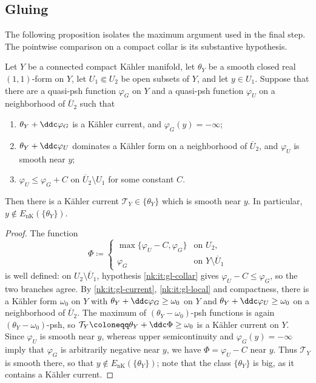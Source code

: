 \subsection{Gluing}

The following proposition isolates the maximum argument used in the final step. The pointwise comparison on a compact collar is its substantive hypothesis.

\begin{proposition}\label{nk:prop:gluing}
Let $Y$ be a connected compact K\"ahler manifold, let $\theta_Y$ be
a smooth closed real $(1,1)$-form on $Y$, let $U_1\Subset U_2$ be
open subsets of $Y$, and let $y\in U_1$. Suppose that there are a
quasi-psh function $\varphi_G$ on $Y$ and a quasi-psh function
$\varphi_U$ on a neighborhood of $\overline U_2$ such that
\begin{enumerate}[label=\textup{(\roman*)},leftmargin=*,itemsep=.25em]
\item\label{nk:it:gl-current}
  $\theta_Y+\ddc\varphi_G$ is a K\"ahler current, and
  $\varphi_G(y)=-\infty$;
\item\label{nk:it:gl-local}
  $\theta_Y+\ddc\varphi_U$ dominates a K\"ahler form on a neighborhood
  of $\overline U_2$, and $\varphi_U$ is smooth near $y$;
\item\label{nk:it:gl-collar}
  $\varphi_U\le\varphi_G+C$ on $\overline U_2\setminus U_1$ for some
  constant $C$.
\end{enumerate}
Then there is a K\"ahler current $\mathcal T_Y\in\{\theta_Y\}$ which is
smooth near $y$. In particular, $y\notin{E_{\mathrm{nK}}}(\{\theta_Y\})$.
\end{proposition}

\begin{proof}
The function
\[
  \Phi\coloneqq 
  \begin{cases}
    \max\{\varphi_U-C,\varphi_G\}&\text{on }U_2,\\
    \varphi_G&\text{on }Y\setminus\overline U_1
  \end{cases}
\]
is well defined: on $U_2\setminus\overline U_1$, hypothesis
\ref{nk:it:gl-collar} gives $\varphi_U-C\le\varphi_G$, so the two
branches agree. By \ref{nk:it:gl-current}, \ref{nk:it:gl-local} and
compactness, there is a K\"ahler form $\omega_0$ on $Y$ with
$\theta_Y+\ddc\varphi_G\ge\omega_0$ on $Y$ and
$\theta_Y+\ddc\varphi_U\ge\omega_0$ on a neighborhood of
$\overline U_2$. The maximum of $(\theta_Y-\omega_0)$-psh functions
is again $(\theta_Y-\omega_0)$-psh, so
$\mathcal T_Y\coloneqq \theta_Y+\ddc\Phi\ge\omega_0$ is a K\"ahler current on
$Y$. Since $\varphi_U$ is smooth near $y$, whereas upper
semicontinuity and $\varphi_G(y)=-\infty$ imply that $\varphi_G$ is
arbitrarily negative near $y$, we have $\Phi=\varphi_U-C$ near
$y$. Thus $\mathcal T_Y$ is smooth there, so that
$y\notin{E_{\mathrm{nK}}}(\{\theta_Y\})$; note that the class $\{\theta_Y\}$ is
big, as it contains a K\"ahler current.
\end{proof}

